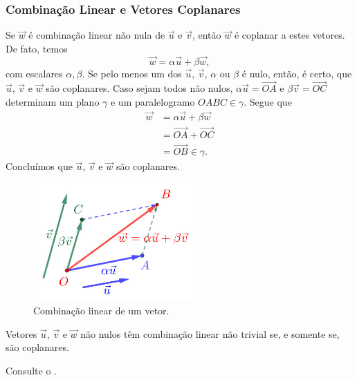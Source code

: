 \subsubsection{Combinação Linear e Vetores Coplanares}

Se $\vec{w}$ é combinação linear não nula de $\vec{u}$ e $\vec{v}$, então $\vec{w}$ é coplanar a estes vetores. De fato, temos
\begin{equation}
  \vec{w} = \alpha\vec{u} + \beta\vec{w},
\end{equation}
com escalares $\alpha,\beta$. Se pelo menos um dos $\vec{u}$, $\vec{v}$, $\alpha$ ou $\beta$ é nulo, então, é certo, que $\vec{u}$, $\vec{v}$ e $\vec{w}$ são coplanares. Caso sejam todos não nulos, $\alpha\vec{u}=\overrightarrow{OA}$ e $\beta\vec{v}=\overrightarrow{OC}$ determinam um plano $\gamma$ e um paralelogramo $OABC\in\gamma$. Segue que
\begin{align}
  \vec{w} &= \alpha\vec{u} + \beta\vec{w}\\
          &= \overrightarrow{OA} + \overrightarrow{OC}\\
          &= \overrightarrow{OB}\in\gamma. 
\end{align}
Concluímos que $\vec{u}$, $\vec{v}$ e $\vec{w}$ são coplanares.

\begin{figure}[h]
  \centering
  \includegraphics[width=2.5in]{./cap_base/dados/fig_comb3vet/fig.jpg}
  \caption{Combinação linear de um vetor.}
  \label{cap_base_sec_comblin:fig:comb3vet}
\end{figure}

\begin{proposicao}\label{cap_base_sec_comblin:prop:comb3vet}
  Vetores $\vec{u}$, $\vec{v}$ e $\vec{w}$ não nulos têm combinação linear não trivial se, e somente se, são coplanares.
\end{proposicao}
\begin{demonstracao}
  Consulte o .
\end{demonstracao}

